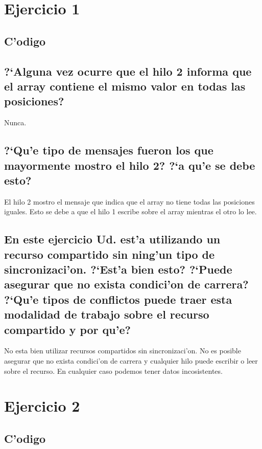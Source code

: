 \documentclass[a4paper,11pt]{article}
\newcommand{\?}{?`}
\begin{document}

\setcounter{page}{1}
\tableofcontents
\newpage
\setcounter{page}{1}

\section{Ejercicio 1}

\subsection{C'odigo}


\subsection[Punto A]{\?Alguna vez ocurre que el hilo 2 informa que el array contiene el mismo valor en todas las posiciones?}
Nunca.

\subsection[Punto B]{\?Qu'e tipo de mensajes fueron los que mayormente mostro el hilo 2? \?a qu'e se debe esto?}
El hilo 2 mostro el mensaje que indica que el array no tiene todas las posiciones iguales. Esto se debe a que el hilo 1 escribe sobre el array mientras el otro lo lee.

\subsection[Punto C]{En este ejercicio Ud. est'a utilizando un recurso compartido sin ning'un tipo de sincronizaci'on. \?Est'a bien esto? \?Puede asegurar que no exista condici'on de carrera? \?Qu'e tipos de conflictos puede traer esta modalidad de trabajo sobre el recurso compartido y por qu'e?}
No esta bien utilizar recursos compartidos sin sincronizaci'on. No es posible asegurar que no exista condici'on de carrera y cualquier hilo puede escribir o leer sobre el recurso.
En cualquier caso podemos tener datos incosistentes.

\section{Ejercicio 2}
\subsection{C'odigo}

\end{document}
